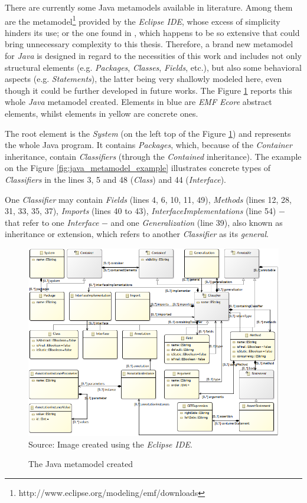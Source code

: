 \documentclass[tuberlin,cic,tc,english,noabntcite, oneside]{iiufrgs}
\begin{document}
There are currently some Java metamodels available in literature. Among them are the metamodel\footnote{http://www.eclipse.org/modeling/emf/downloads} provided by the \emph{Eclipse IDE}, whose excess of simplicity hinders its use; or the one found in \citet{heidenreich2010closing}, which happens to be so extensive that could bring unnecessary complexity to this thesis. Therefore, a brand new metamodel for \emph{Java} is designed in regard to the necessities of this work and includes not only structural elements (e.g. \emph{Packages}, \emph{Classes}, \emph{Fields}, etc.), but also some behavioral aspects (e.g. \emph{Statements}), the latter being very shallowly modeled here, even though it could be further developed in future works. The Figure \ref{fig:java_metamodel} reports this whole \emph{Java} metamodel created. Elements in blue are \emph{EMF Ecore} abstract elements, whilst elements in yellow are concrete ones.

The root element is the \emph{System} (on the left top of the Figure \ref{fig:java_metamodel}) and represents the whole Java program. It contains \emph{Packages}, which, because of the \emph{Container} inheritance, contain \emph{Classifiers} (through the \emph{Contained} inheritance). The example on the Figure \ref{fig:java_metamodel_example} illustrates concrete types of \emph{Classifiers} in the lines 3, 5 and 48 (\emph{Class}) and 44 (\emph{Interface}).

One \emph{Classifier} may contain \emph{Fields} (lines 4, 6, 10, 11, 49), \emph{Methods} (lines 12, 28, 31, 33, 35, 37), \emph{Imports} (lines 40 to 43), \emph{InterfaceImplementations} (line 54) $-$ that refer to one \emph{Interface} $-$ and one \emph{Generalization} (line 39), also known as inheritance or extension, which refers to another \emph{Classifier} as its \emph{general}.

\begin{figure}[H]
	\centering
    \caption{The Java metamodel created}
    \includegraphics[width=\textwidth]{javaMetamodel} \\
    Source: Image created using the \emph{Eclipse IDE}.
    \label{fig:java_metamodel}
\end{figure}
\end{document}
